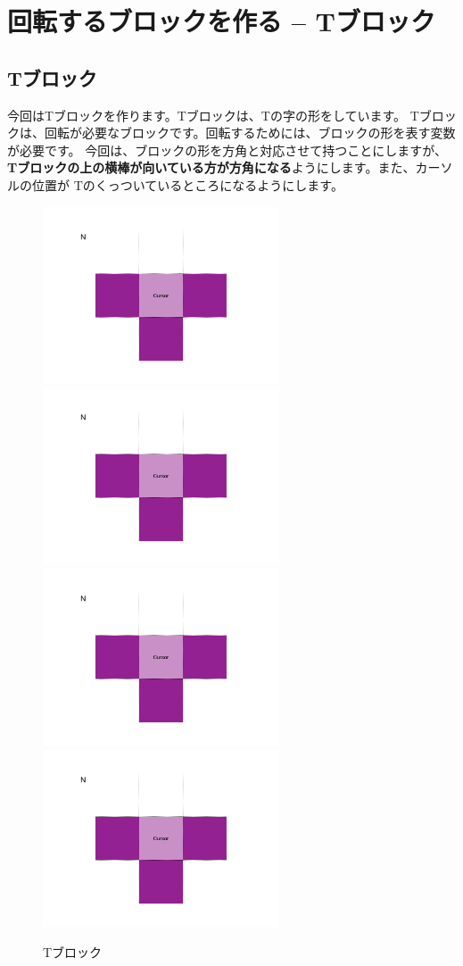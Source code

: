 \chapter{回転するブロックを作る -- Tブロック}
\section{Tブロック}
今回はTブロックを作ります。Tブロックは、Tの字の形をしています。
Tブロックは、回転が必要なブロックです。回転するためには、ブロックの形を表す変数が必要です。
今回は、ブロックの形を方角と対応させて持つことにしますが、
\textbf{Tブロックの上の横棒が向いている方が方角になる}ようにします。また、カーソルの位置が
Tのくっついているところになるようにします。

\begin{figure}[h]
  \includegraphics[width=70mm, page=1]{images/Blocks.pdf}
  \includegraphics[width=70mm, page=2]{images/Blocks.pdf}
  \includegraphics[width=70mm, page=3]{images/Blocks.pdf}
  \includegraphics[width=70mm, page=4]{images/Blocks.pdf}
  \caption{Tブロック}
\end{figure}

